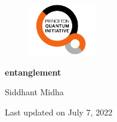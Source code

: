 \documentclass{article}
\title{}
\author{Siddhant Midha}
\date{}
\newcommand{\updateinfo}[1][\today]{\par\vfill\hfill{\scriptsize\color{gray}Last updated on July 7, 2022}}
\theoremstyle{definition}
\begin{document}
\begin{titlepage}
    \centering
    \begin{figure}[htp]
        \centering
        \includegraphics[width=3cm]{pqi.png}
         \label{fig:pqi}
    \end{figure}
    {\scshape\LARGE  \par}
    \vspace{1cm}
    \vspace{1.2cm}
    {\huge\bfseries entanglement\par}
        \vspace{0.3cm}

    {\scshape \par}
    \vspace{2cm}
    {\Large Siddhant Midha\par}
    \vfill
   

    {\large  }
\updateinfo 
\end{titlepage}
\tableofcontents\newpage 
{}

\newpage 



\newpage 


\end{document}
